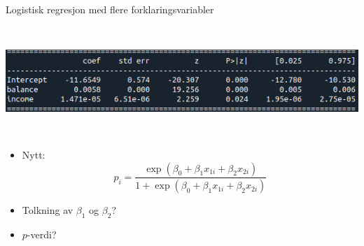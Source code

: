 \documentclass[10pt,ignorenonframetext,]{beamer}
\providecommand{\tightlist}{%
  \setlength{\itemsep}{0pt}\setlength{\parskip}{0pt}}
\begin{document}
\begin{frame}

\begin{block}{Logistisk regresjon med flere forklaringsvariabler}

\(~\)

\includegraphics{default_multiple.png}

\(~\)

\begin{itemize}
\tightlist
\item
  Nytt:
  \[p_i = \frac{\exp(\beta_0 + \beta_1 x_{1i} + \beta_2 x_{2i})}{ 1 + \exp(\beta_0 + \beta_1 x_{1i} + \beta_2 x_{2i})}\]
\end{itemize}

\vspace{2mm}

\begin{itemize}
\tightlist
\item
  Tolkning av \(\beta_1\) og \(\beta_2\)?
\end{itemize}

\vspace{2mm}

\begin{itemize}
\tightlist
\item
  \(p\)-verdi?
\end{itemize}

\end{block}

\end{frame}
\end{document}
